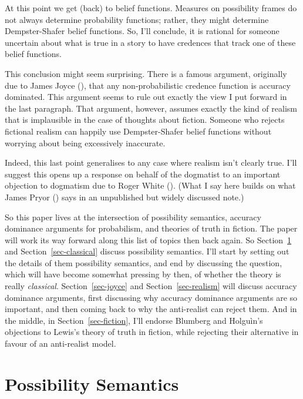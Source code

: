 \documentclass[
  11pt,
  letterpaper,
  DIV=11,
  numbers=noendperiod,
  twoside]{scrartcl}
\begin{document}
At this point we get (back) to belief functions. Measures on possibility
frames do not always determine probability functions; rather, they might
determine Dempster-Shafer belief functions. So, I'll conclude, it is
rational for someone uncertain about what is true in a story to have
credences that track one of these belief functions.

This conclusion might seem surprising. There is a famous argument,
originally due to James Joyce (), that any
non-probabilistic credence function is accuracy dominated. This argument
seems to rule out exactly the view I put forward in the last paragraph.
That argument, however, assumes exactly the kind of realism that is
implausible in the case of thoughts about fiction. Someone who rejects
fictional realism can happily use Dempster-Shafer belief functions
without worrying about being excessively inaccurate.

Indeed, this last point generalises to any case where realism isn't
clearly true. I'll suggest this opens up a response on behalf of the
dogmatist to an important objection to dogmatism due to Roger White
(). (What I say here builds on what James
Pryor () says in an unpublished but widely
discussed note.)

So this paper lives at the intersection of possibility semantics,
accuracy dominance arguments for probabilism, and theories of truth in
fiction. The paper will work its way forward along this list of topics
then back again. So Section~\ref{sec-humberstone} and
Section~\ref{sec-classical} discuss possibility semantics. I'll start by
setting out the details of them possibility semantics, and end by
discussing the question, which will have become somewhat pressing by
then, of whether the theory is really \emph{classical}.
Section~\ref{sec-joyce} and Section~\ref{sec-realism} will discuss
accuracy dominance arguments, first discussing why accuracy dominance
arguments are so important, and then coming back to why the anti-realist
can reject them. And in the middle, in Section~\ref{sec-fiction}, I'll
endorse Blumberg and Holguìn's objections to Lewis's theory of truth in
fiction, while rejecting their alternative in favour of an anti-realist
model.

\section{Possibility Semantics}\label{sec-humberstone}
\end{document}
